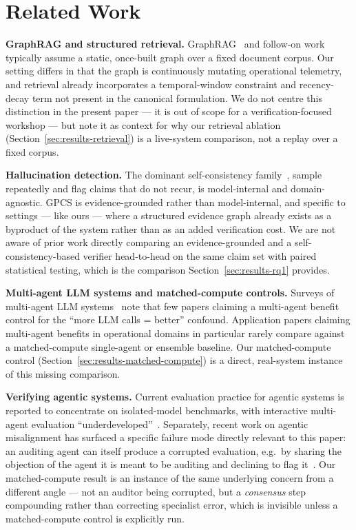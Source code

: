 \documentclass{article}
\begin{document}
\section{Related Work}
\label{sec:related}

\textbf{GraphRAG and structured retrieval.} GraphRAG~\citep{edge2024} and
follow-on work typically assume a static, once-built graph over a fixed
document corpus. Our setting differs in that the graph is continuously
mutating operational telemetry, and retrieval already incorporates a
temporal-window constraint and recency-decay term not present in the
canonical formulation. We do not centre this distinction in the present
paper --- it is out of scope for a verification-focused workshop --- but
note it as context for why our retrieval ablation
(Section~\ref{sec:results-retrieval}) is a live-system comparison, not a
replay over a fixed corpus.

\textbf{Hallucination detection.} The dominant self-consistency
family~\citep{wang2023}, sample repeatedly and flag claims that do not
recur, is model-internal and domain-agnostic. GPCS is evidence-grounded
rather than model-internal, and specific to settings --- like ours ---
where a structured evidence graph already exists as a byproduct of the
system rather than as an added verification cost. We are not aware of
prior work directly comparing an evidence-grounded and a
self-consistency-based verifier head-to-head on the same claim set with
paired statistical testing, which is the comparison
Section~\ref{sec:results-rq1} provides.

\textbf{Multi-agent LLM systems and matched-compute controls.} Surveys of
multi-agent LLM systems~\citep{guo2024} note that few papers claiming a
multi-agent benefit control for the ``more LLM calls = better'' confound.
Application papers claiming multi-agent benefits in operational domains in
particular rarely compare against a matched-compute single-agent or
ensemble baseline. Our matched-compute control
(Section~\ref{sec:results-matched-compute}) is a direct, real-system
instance of this missing comparison.

\textbf{Verifying agentic systems.} Current evaluation practice for
agentic systems is reported to concentrate on isolated-model benchmarks,
with interactive multi-agent evaluation ``underdeveloped''~\citep{aigi2026}.
Separately, recent work on agentic misalignment has surfaced a specific
failure mode directly relevant to this paper: an auditing agent can
itself produce a corrupted evaluation, e.g.\ by sharing the objection of
the agent it is meant to be auditing and declining to flag
it~\citep{anthropic2026}. Our matched-compute result is an instance of the
same underlying concern from a different angle --- not an auditor being
corrupted, but a \emph{consensus} step compounding rather than correcting
specialist error, which is invisible unless a matched-compute control is
explicitly run.
\end{document}

